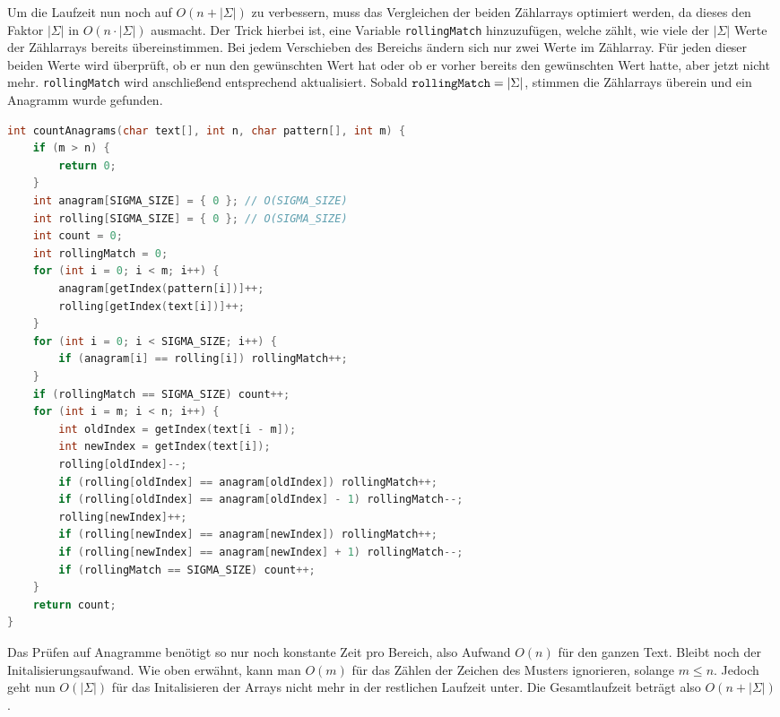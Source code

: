 \documentclass[11pt,a4paper]{article}
\begin{document}
\begin{loesung}
\begin{enumerate}
        Um die Laufzeit nun noch auf $O(n + |\Sigma|)$ zu verbessern, muss das Vergleichen der beiden Zählarrays optimiert werden, da dieses den Faktor $|\Sigma|$ in $O(n \cdot |\Sigma|)$ ausmacht.
        Der Trick hierbei ist, eine Variable \texttt{rollingMatch} hinzuzufügen, welche zählt, wie viele der $|\Sigma|$ Werte der Zählarrays bereits übereinstimmen.
        Bei jedem Verschieben des Bereichs ändern sich nur zwei Werte im Zählarray.
        Für jeden dieser beiden Werte wird überprüft, ob er nun den gewünschten Wert hat oder ob er vorher bereits den gewünschten Wert hatte, aber jetzt nicht mehr.
        \texttt{rollingMatch} wird anschließend entsprechend aktualisiert.
        Sobald $\text{\texttt{rollingMatch}} = |\Sigma|$, stimmen die Zählarrays überein und ein Anagramm wurde gefunden.
        \begin{lstlisting}[language=c++]
int countAnagrams(char text[], int n, char pattern[], int m) {
    if (m > n) {
        return 0;
    }
    int anagram[SIGMA_SIZE] = { 0 }; // O(SIGMA_SIZE)
    int rolling[SIGMA_SIZE] = { 0 }; // O(SIGMA_SIZE)
    int count = 0;
    int rollingMatch = 0;
    for (int i = 0; i < m; i++) {
        anagram[getIndex(pattern[i])]++;
        rolling[getIndex(text[i])]++;
    }
    for (int i = 0; i < SIGMA_SIZE; i++) {
        if (anagram[i] == rolling[i]) rollingMatch++;
    }
    if (rollingMatch == SIGMA_SIZE) count++;
    for (int i = m; i < n; i++) {
        int oldIndex = getIndex(text[i - m]);
        int newIndex = getIndex(text[i]);
        rolling[oldIndex]--;
        if (rolling[oldIndex] == anagram[oldIndex]) rollingMatch++;
        if (rolling[oldIndex] == anagram[oldIndex] - 1) rollingMatch--;
        rolling[newIndex]++;
        if (rolling[newIndex] == anagram[newIndex]) rollingMatch++;
        if (rolling[newIndex] == anagram[newIndex] + 1) rollingMatch--;
        if (rollingMatch == SIGMA_SIZE) count++;
    }
    return count;
}
        \end{lstlisting}
        Das Prüfen auf Anagramme benötigt so nur noch konstante Zeit pro Bereich, also Aufwand $O(n)$ für den ganzen Text.
        Bleibt noch der Initalisierungsaufwand.
        Wie oben erwähnt, kann man $O(m)$ für das Zählen der Zeichen des Musters ignorieren, solange $m \leq n$.
        Jedoch geht nun $O(|\Sigma|)$ für das Initalisieren der Arrays nicht mehr in der restlichen Laufzeit unter.
        Die Gesamtlaufzeit beträgt also $O(n + |\Sigma|)$.
    \end{enumerate}
\end{loesung}
\end{document}
